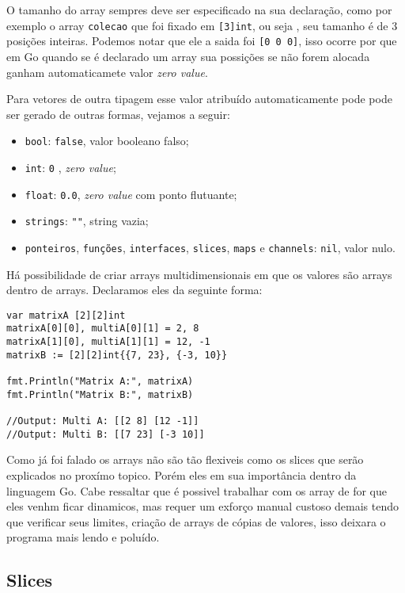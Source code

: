 \documentclass{SBCbookchapter}
\begin{document}
O tamanho do array sempres deve ser especificado na sua declaração, como por exemplo o array \texttt{colecao} que foi fixado em \texttt{[3]int}, ou seja , seu tamanho é de 3 posições inteiras. Podemos notar que ele a saida foi \texttt{[0 0 0]}, isso ocorre por que em Go quando se é declarado um array sua possições se não forem alocada ganham automaticamete valor \textit{zero value}.

Para vetores de outra tipagem esse valor atribuído automaticamente pode pode ser gerado de outras formas, vejamos a seguir:

\begin{itemize}
	\item \texttt{bool}: \texttt{false}, valor booleano falso;
	\item \texttt{int}: \texttt{0} , \textit{zero value};
	\item \texttt{float}: \texttt{0.0}, \textit{zero value} com ponto flutuante;
	\item \texttt{strings}: \texttt{""}, string vazia;
	\item \texttt{ponteiros}, \texttt{funções}, \texttt{interfaces}, \texttt{slices}, \texttt{maps} e \texttt{channels}: \texttt{nil}, valor nulo.
\end{itemize}


Há possibilidade de criar arrays multidimensionais em que os valores são arrays dentro de arrays. Declaramos eles da seguinte forma:


\begin{lstlisting}
var matrixA [2][2]int
matrixA[0][0], multiA[0][1] = 2, 8
matrixA[1][0], multiA[1][1] = 12, -1
matrixB := [2][2]int{{7, 23}, {-3, 10}}

fmt.Println("Matrix A:", matrixA)
fmt.Println("Matrix B:", matrixB)

//Output: Multi A: [[2 8] [12 -1]]
//Output: Multi B: [[7 23] [-3 10]]
\end{lstlisting}

Como já foi falado os arrays não são tão flexiveis como os slices que serão explicados no proxímo topico. Porém eles em sua importância dentro da linguagem Go. Cabe ressaltar que é possivel trabalhar com os array de for que eles venhm ficar dinamicos, mas requer um exforço manual custoso demais tendo que verificar seus limites, criação de arrays de cópias de valores, isso deixara o programa mais lendo e poluído.

\subsection{Slices}
\end{document}
